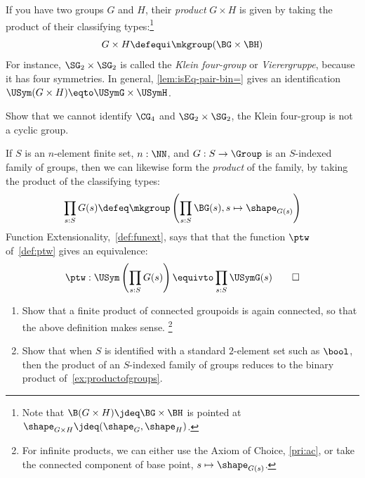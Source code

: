 \begin{example}\label{ex:productofgroups}
  If you have two groups $G$ and $H$,
  their \emph{product} $G\times H$ is given by taking
  the product of their classifying types:\footnote{%
    Note that $\B(G\times H)\jdeq \BG\times \BH$ is pointed at
  $\shape_{G\times H}\jdeq(\shape_G,\shape_H)$.}
  \[
    G\times H\defequi \mkgroup(\BG\times\BH)
  \]
  For instance, $\SG_2\times\SG_2$ is called the
  \emph{Klein four-group} or \emph{Vierergruppe}, because
  it has four symmetries.
  In general, \cref{lem:isEq-pair-bin=} gives an identification $\USym(G\times H) \eqto \USymG\times\USymH$.
\end{example}

\begin{xca}\label{xca:klein-not-cyclic}
  Show that we cannot identify $\CG_4$ and $\SG_2\times\SG_2$,
  \ie the Klein four-group is not a cyclic group.
\end{xca}

\begin{example}\label{ex:bigproductofgroups}
  If $S$ is an $n$-element finite set, $n : \NN$,
  and $G : S \to \Group$ is an $S$-indexed family of groups,
  then we can likewise form the \emph{product} of the family,
  by taking the product of the classifying types:
  \[
    \prod_{s:S}G(s) \defeq
    \mkgroup\left(\prod_{s:S}\BG(s),s\mapsto \shape_{G(s)}\right)
  \]
  Function Extensionality,~\cref{def:funext}, says
  that that the function $\ptw$ of~\cref{def:ptw}
  gives an equivalence:
  \[
    \ptw : \USym\left(\prod_{s:S}G(s)\right)
    \equivto
    \prod_{s:S}\USymG(s)\qedhere
  \]
\end{example}

\begin{xca}\label{xca:bigproductfunext}
  \begin{enumerate}
  \item\label{it:bigproductfunext-i}
    Show that a finite product of connected groupoids
    is again connected, so that the above definition makes sense.%
    \footnote{For infinite products,
      we can either use the Axiom of Choice, \cref{pri:ac},
      or take the connected component of base point,
      $s \mapsto \shape_{G(s)}$.}
  \item
    Show that when $S$ is identified with a standard $2$-element set
    such as $\bool$, then the product of an $S$-indexed family
    of groups reduces to the binary product of~\cref{ex:productofgroups}.\qedhere
  \end{enumerate}
\end{xca}

